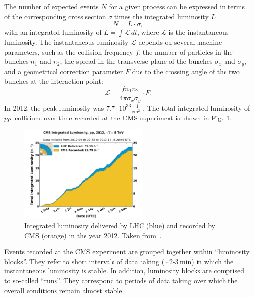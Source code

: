 The number of expected events $N$ for a given process can be expressed in terms of the corresponding cross section $\sigma$ times the integrated luminosity $L$
\begin{equation}
N = L \cdot \sigma,
\end{equation}
with an integrated luminosity of $L=\int \mathcal{L}\, dt$, where $\mathcal{L}$ is the instantaneous luminosity.
The instantaneous luminosity $\mathcal{L}$ depends on several machine parameters, such as the collision frequency $f$, the number of particles in the bunches $n_1$ and $n_2$,
the spread in the transverse plane of the bunches $\sigma_x$ and $\sigma_y$, and a geometrical correction parameter $F$ due to the crossing angle of the two bunches at the interaction point:
\begin{equation}
\mathcal{L} = \frac{f n_1 n_2 }{4 \pi \sigma_x \sigma_y} \cdot F.
\end{equation}
In 2012, the peak luminosity was $7.7 \cdot 10^{33} \frac{1}{\text{cm}^2\,\text{s}}$.
The total integrated luminosity of $pp$~collisions over time recorded at the CMS experiment is shown in Fig.~\ref{fig:Lumi}.
\begin{figure}[!b]
  \centering
      \includegraphics[width=0.57\textwidth]{figures/experiment/LHC/int_lumi_per_day_cumulative_pp_2012.pdf}
  \caption{Integrated luminosity delivered by LHC (blue) and recorded by CMS (orange) in the year 2012. Taken from~\cite{bib:LumiWiki}.}  
  \label{fig:Lumi}
\end{figure}
Events recorded at the CMS experiment are grouped together within ``luminosity blocks''.
They refer to short intervals of data taking ($\sim$2-3\,min) in which the instantaneous luminosity is stable.
In addition, luminosity blocks are comprised to so-called ``runs''.
They correspond to periods of data taking over which the overall conditions remain almost stable.
\FloatBarrier
